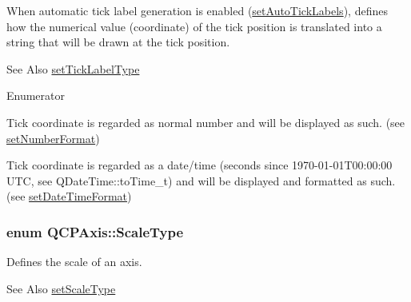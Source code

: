 When automatic tick label generation is enabled (\hyperlink{classQCPAxis_aaa47e3a6bac0c20d4beb9028f01bc1a1}{set\-Auto\-Tick\-Labels}), defines how the numerical value (coordinate) of the tick position is translated into a string that will be drawn at the tick position. \begin{DoxySeeAlso}{See Also}
\hyperlink{classQCPAxis_a54f24f5ce8feea25209388a863d7e448}{set\-Tick\-Label\-Type} 
\end{DoxySeeAlso}
\begin{Desc}
\item[Enumerator]\par
\begin{description}
\item[{\em 
\hypertarget{classQCPAxis_a4a7da0166f755f5abac23b765d184cada7f1eacf3b73adaefd334bea04e094b7e}{lt\-Number}\label{classQCPAxis_a4a7da0166f755f5abac23b765d184cada7f1eacf3b73adaefd334bea04e094b7e}
}]Tick coordinate is regarded as normal number and will be displayed as such. (see \hyperlink{classQCPAxis_ae585a54dc2aac662e90a2ca82f002590}{set\-Number\-Format}) \item[{\em 
\hypertarget{classQCPAxis_a4a7da0166f755f5abac23b765d184cadafc70594a9d877124dd11ccc187d4ac52}{lt\-Date\-Time}\label{classQCPAxis_a4a7da0166f755f5abac23b765d184cadafc70594a9d877124dd11ccc187d4ac52}
}]Tick coordinate is regarded as a date/time (seconds since 1970-\/01-\/01\-T00\-:00\-:00 U\-T\-C, see Q\-Date\-Time\-::to\-Time\-\_\-t) and will be displayed and formatted as such. (see \hyperlink{classQCPAxis_a2ee0191daa03524a682113e63e05f7a7}{set\-Date\-Time\-Format}) \end{description}
\end{Desc}
\hypertarget{classQCPAxis_a36d8e8658dbaa179bf2aeb973db2d6f0}{
\subsubsection[{Scale\-Type}]{\setlength{\rightskip}{0pt plus 5cm}enum {\bf Q\-C\-P\-Axis\-::\-Scale\-Type}}}\label{classQCPAxis_a36d8e8658dbaa179bf2aeb973db2d6f0}
Defines the scale of an axis. \begin{DoxySeeAlso}{See Also}
\hyperlink{classQCPAxis_adb6c5c45bdf899ea221881dd3b43b406}{set\-Scale\-Type} 
\end{DoxySeeAlso}
